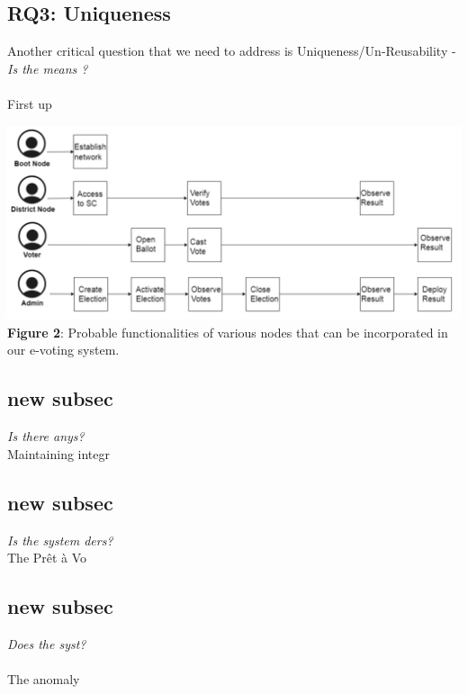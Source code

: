 \documentclass[12pt,a4paper]{article}%
\begin{document}
\begin{flushleft}
		\subsection{RQ3: Uniqueness}
		\begin{flushleft}
			\justify
			 Another critical question that we need to address is Uniqueness/Un-Reusability - \textit{Is the means ?}\\\\
			First up
			\begin{center}
				\includegraphics[width=0.90 \textwidth]{./flow_diagram_CA.png}	
				\\\textbf{Figure 2}: Probable functionalities of various nodes that can be incorporated in our e-voting system.
			\end{center}
				
		\end{flushleft}
	
	
		\subsection{new subsec}
		\begin{flushleft}
			\justify
			\textit{Is there anys?}\\
			
			Maintaining integr
			
			
		\end{flushleft}
		
		\subsection{new subsec}
		\begin{flushleft}
			\justify
			\textit{Is the system ders?}\\
			
			The Prêt à Vo
			
			
		\end{flushleft}
		\subsection{new subsec}
		\begin{flushleft}
			\justify
			 \textit{Does the syst?}\\ \\
			The anomaly 
			

\end{flushleft}
\end{flushleft}
\end{document}
